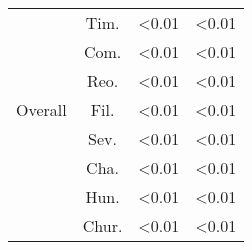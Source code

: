 \begin{table}[]
\begin{tabular}{cccc}
          & Tim.   & \textless0.01         & \textless0.01         \\  \rowcolor{gray!25}
          & Com.   & \textless0.01         & \textless0.01         \\  \rowcolor{gray!25}
          & Reo.   & \textless0.01         & \textless0.01         \\  \rowcolor{gray!25}
Overall   & Fil.   & \textless0.01         & \textless0.01         \\  \rowcolor{gray!25}
          & Sev.   & \textless0.01         & \textless0.01         \\  \rowcolor{gray!25}
          & Cha.   & \textless0.01         & \textless0.01         \\  \rowcolor{gray!25}
          & Hun.   & \textless0.01         & \textless0.01         \\  \rowcolor{gray!25}
          & Chur.  & \textless0.01         & \textless0.01
\end{tabular}
\end{table}
